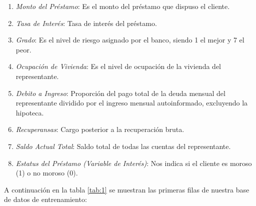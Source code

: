 \documentclass[a4paper,12pt]{article}
\begin{document}
\begin{enumerate}
    \item \emph{Monto del Préstamo}: Es el monto del préstamo que dispuso el cliente.
    \item \emph{Tasa de Interés}: Tasa de interés del préstamo.
    \item \emph{Grado}: Es el nivel de riesgo asignado por el banco, siendo 1 el mejor y 7 el peor.
    \item \emph{Ocupación de Vivienda}: Es el nivel de ocupación de la vivienda del representante.
    \item \emph{Debito a Ingreso}: Proporción del pago total de la deuda mensual del representante dividido por el ingreso mensual autoinformado, excluyendo la hipoteca.
    \item \emph{Recuperansas}: Cargo posterior a la recuperación bruta.
    \item \emph{Saldo Actual Total}: Saldo total de todas las cuentas del representante.
    \item \emph{Estatus del Préstamo (Variable de Interés)}: Nos indica si el cliente es moroso (1) o no moroso (0).
\end{enumerate}

A continuación en la tabla \ref{tab:1} se muestran las primeras filas de nuestra base de datos de entrenamiento:

\begin{table}[h]
    \centering
    \caption{Base de Entrenamiento para Morosidad en Clientes.}
    \label{tab:1}
\end{table}
\end{document}
